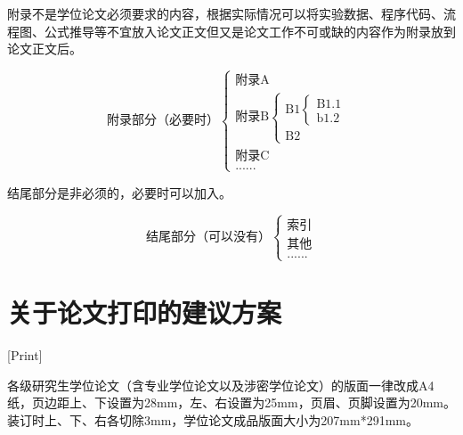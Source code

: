 附录不是学位论文必须要求的内容，根据实际情况可以将实验数据、程序代码、流程图、公式推导等不宜放入论文正文但又是论文工作不可或缺的内容作为附录放到论文正文后。

\[
    \text{附录部分（必要时）}
    \begin{cases}
        \text{附录A}               \\
        \text{附录B}
        \begin{cases}
            \text{B1}
            \begin{cases}
                \text{B1.1} \\
                \text{b1.2}
            \end{cases} \\
            \text{B2}
        \end{cases} \\
        \text{附录C}               \\
        \text{......}
    \end{cases}
\]

结尾部分是非必须的，必要时可以加入。

\[
    \text{结尾部分（可以没有）}
    \begin{cases}
        \text{索引} \\
        \text{其他} \\
        \text{......}
    \end{cases}
\]

\chapter{关于论文打印的建议方案}[Print]

各级研究生学位论文（含专业学位论文以及涉密学位论文）的版面一律改成A4纸，页边距上、下设置为28mm，左、右设置为25mm，页眉、页脚设置为20mm。装订时上、下、右各切除3mm，学位论文成品版面大小为207mm*291mm。

